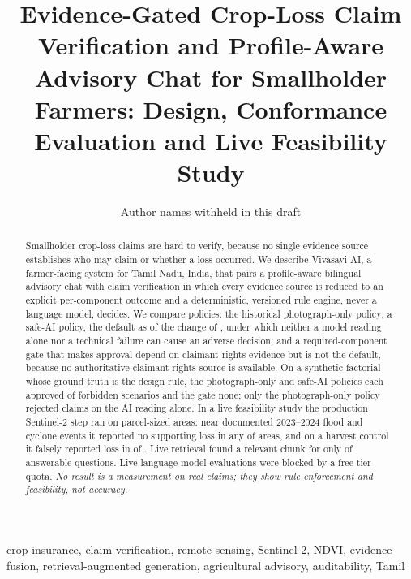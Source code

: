 \documentclass[journal]{IEEEtran}
\begin{document}
\title{Evidence-Gated Crop-Loss Claim Verification and Profile-Aware Advisory Chat for Smallholder Farmers: Design, Conformance Evaluation and Live Feasibility Study}

\author{Author names withheld in this draft}

\maketitle

\begin{abstract}
Smallholder crop-loss claims are hard to verify, because no single evidence source establishes who may claim or whether a loss occurred. We describe Vivasayi AI, a farmer-facing system for Tamil Nadu, India, that pairs a profile-aware bilingual advisory chat with claim verification in which every evidence source is reduced to an explicit per-component outcome and a deterministic, versioned rule engine, never a language model, decides. We compare \PolicyCountWord{} policies: the historical photograph-only policy; a safe-AI policy, the default as of the change of \PolicySafeAiDate{}, under which neither a model reading alone nor a technical failure can cause an adverse decision; and a required-component gate that makes approval depend on claimant-rights evidence but is not the default, because no authoritative claimant-rights source is available. On a synthetic factorial whose ground truth is the design rule, the photograph-only and safe-AI policies each approved \FusionLegacyInvalidApprovals{} of \FusionInvalidApprovalDenominator{} forbidden scenarios and the gate none; only the photograph-only policy rejected claims on the AI reading alone. In a live feasibility study the production Sentinel-2 step ran on \SatLiveSquares{} parcel-sized areas: near \SatEventCountWord{} documented 2023--2024 flood and cyclone events it reported no supporting loss in any of \SatEventSquares{} areas, and on a harvest control it falsely reported loss in \SatControlSupports{} of \SatControlSquares{}. Live retrieval found a relevant chunk for only \RagAnswerableRelevantHits{} of \RagAnswerableQueries{} answerable questions. Live language-model evaluations were blocked by a free-tier quota. \emph{No result is a measurement on real claims; they show rule enforcement and feasibility, not accuracy.}
\end{abstract}

\begin{IEEEkeywords}
crop insurance, claim verification, remote sensing, Sentinel-2, NDVI, evidence fusion, retrieval-augmented generation, agricultural advisory, auditability, Tamil
\end{IEEEkeywords}
\end{document}
